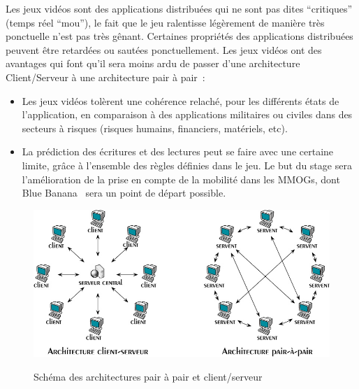 	\par Les jeux vidéos sont des applications distribuées qui ne sont pas dites ``critiques'' (temps réel ``mou''), le fait que le jeu ralentisse légèrement de manière très ponctuelle n'est pas très gênant. Certaines propriétés des applications distribuées peuvent être retardées ou sautées ponctuellement. Les jeux vidéos ont des avantages qui font qu'il sera moins ardu de passer d'une architecture Client/Serveur à une architecture pair à pair~\cite{1267692}:
	\begin{itemize}
		\renewcommand{\labelitemi}{$\bullet$}
		\item Les jeux vidéos tolèrent une cohérence relaché, pour les différents états de l'application, en comparaison à des applications militaires ou civiles dans des secteurs à risques (risques humains, financiers, matériels, etc).
		\item La prédiction des écritures et des lectures peut se faire avec une certaine limite, grâce à l'ensemble des règles définies dans le jeu. Le but du stage sera l'amélioration de la prise en compte de la mobilité dans les MMOGs, dont Blue Banana~\cite{191} sera un point de départ possible.
	\end{itemize}
	\vspace{1cm}
	\begin{figure}[!h]
	\centering
	\includegraphics[scale=0.45]{./Ressources/Images/p2p-85145.png}\\
	\caption{Schéma des architectures pair à pair et client/serveur}
	\label{P2P/ClServ}
	\end{figure} 
\newpage
